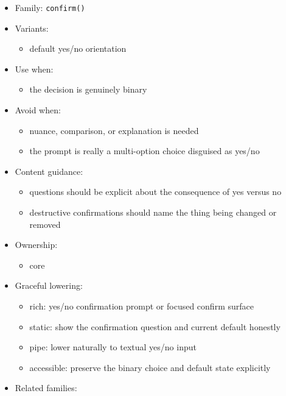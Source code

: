 \begin{itemize}
\tightlist
\item
  Family: \texttt{c\allowbreak{}o\allowbreak{}n\allowbreak{}f\allowbreak{}i\allowbreak{}r\allowbreak{}m\allowbreak{}(\allowbreak{})}
\item
  Variants:

  \begin{itemize}
  \tightlist
  \item
    default yes/no orientation
  \end{itemize}
\item
  Use when:

  \begin{itemize}
  \tightlist
  \item
    the decision is genuinely binary
  \end{itemize}
\item
  Avoid when:

  \begin{itemize}
  \tightlist
  \item
    nuance, comparison, or explanation is needed
  \item
    the prompt is really a multi-option choice disguised as yes/no
  \end{itemize}
\item
  Content guidance:

  \begin{itemize}
  \tightlist
  \item
    questions should be explicit about the consequence of yes versus no
  \item
    destructive confirmations should name the thing being changed or removed
  \end{itemize}
\item
  Ownership:

  \begin{itemize}
  \tightlist
  \item
    core
  \end{itemize}
\item
  Graceful lowering:

  \begin{itemize}
  \tightlist
  \item
    rich: yes/no confirmation prompt or focused confirm surface
  \item
    static: show the confirmation question and current default honestly
  \item
    pipe: lower naturally to textual yes/no input
  \item
    accessible: preserve the binary choice and default state explicitly
  \end{itemize}
\item
  Related families:


\end{itemize}
